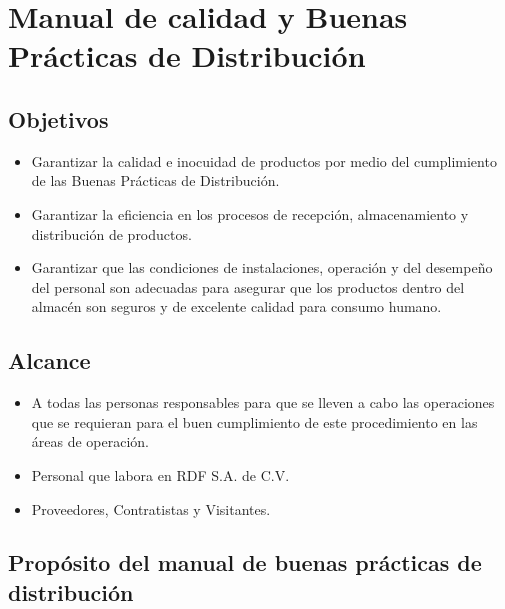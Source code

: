 \thispagestyle{formato-PI}
\renewcommand{\MayorVer}{2}
\renewcommand{\MenorVer}{0}
\renewcommand{\Codigo}{BPD-3-MAN}
\renewcommand{\FechaPub}{2023--01}
\renewcommand{\Titulo}{Manual de calidad y Buenas Prácticas de Distribución}

\section{\Titulo}
\subsection{Objetivos}

\begin{itemize}
	\item Garantizar la calidad e inocuidad de productos por medio del cumplimiento de las Buenas Prácticas de Distribución.
	\item Garantizar la eficiencia en los procesos de recepción, almacenamiento y distribución de productos.
	\item Garantizar que las condiciones de instalaciones, operación y del desempeño del personal son adecuadas para asegurar que los productos dentro del almacén son seguros y de excelente calidad para consumo humano.
\end{itemize}

\subsection{Alcance}

\begin{itemize}
	\item A todas las personas responsables para que se lleven a cabo las operaciones que se requieran para el buen cumplimiento de este procedimiento en las áreas de operación.
	\item Personal que labora en \gls{RDF} S.A. de C.V.
	\item Proveedores, Contratistas y Visitantes.
\end{itemize}

\subsection{Propósito del manual de buenas prácticas de distribución}

